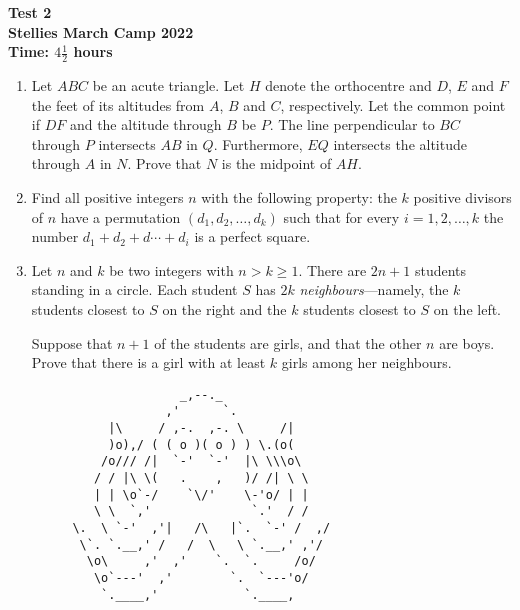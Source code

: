 \documentclass{article}
\begin{document}
\thispagestyle{empty}

\begin{center}
  \textbf{\Large Test 2}
  \\ \vspace{1em}
  \textbf{\large Stellies March Camp 2022}
  \\ \vspace{1em}
  \textbf{\large Time: $4\frac{1}{2}$ hours}
\end{center}

\vspace{24pt}

\begin{enumerate}[itemsep=12pt]

\item %
Let $ABC$ be an acute triangle.
Let $H$ denote the orthocentre and $D$, $E$ and $F$ the feet of its altitudes from $A$, $B$ and $C$, respectively.
Let the common point if $DF$ and the altitude through $B$ be $P$.
The line perpendicular to $BC$ through $P$ intersects $AB$ in $Q$.
Furthermore, $EQ$ intersects the altitude through $A$ in $N$.
Prove that $N$ is the midpoint of $AH$.

\item %
Find all positive integers $n$ with the following property:
the $k$ positive divisors of $n$ have a permutation $(d_1, d_2, \dotsc, d_k)$ such that for every $i = 1, 2, \dotsc, k$ the number $d_1 +d_2 +d\dotsb +d_i$ is a perfect square.

\item %
Let $n$ and $k$ be two integers with $n > k \geq 1$.
There are $2n+1$ students standing in a circle.
Each student $S$ has $2k$ \emph{neighbours}---namely, the $k$ students closest to $S$ on the right and the $k$ students closest to $S$ on the left.

Suppose that $n+1$ of the students are girls, and that the other $n$ are boys.
Prove that there is a girl with at least $k$ girls among her neighbours.

\end{enumerate}

\vfill
\centering
\begin{BVerbatim}
                        _,--._
                      ,'      `.
              |\     / ,-.  ,-. \     /|
              )o),/ ( ( o )( o ) ) \.(o(
             /o/// /|  `-'  `-'  |\ \\\o\
            / / |\ \(   .    ,   )/ /| \ \
            | | \o`-/    `\/'    \-'o/ | |
            \ \  `,'              `.'  / /
         \.  \ `-'  ,'|   /\   |`.  `-' /  ,/
          \`. `.__,' /   /  \   \ `.__,' ,'/
           \o\     ,'  ,'    `.  `.     /o/
            \o`---'  ,'        `.  `---'o/
             `.____,'            `.____,
\end{BVerbatim}
\end{document}
